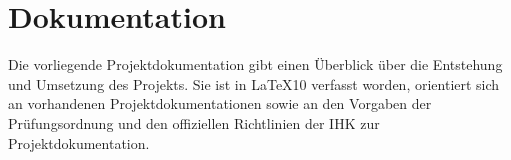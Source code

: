 \section{Dokumentation}
\label{sec:Dokumentation}

%
Die vorliegende Projektdokumentation gibt einen Überblick über die Entstehung und Umsetzung des Projekts.
Sie ist in LaTeX10 verfasst worden, orientiert sich an vorhandenen Projektdokumentationen sowie an den Vorgaben der Prüfungsordnung und den offiziellen Richtlinien der \ac{IHK} zur Projektdokumentation.